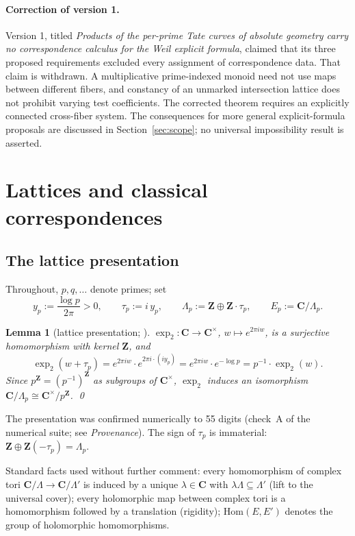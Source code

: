 \documentclass[11pt]{article}
\newtheorem{lemma}{Lemma}
\theoremstyle{definition}
\theoremstyle{remark}
\newcommand{\Z}{\mathbf{Z}}
\newcommand{\C}{\mathbf{C}}
\newcommand{\Hom}{\mathrm{Hom}}
\begin{document}
\paragraph{Correction of version 1.}
Version 1, titled \emph{Products of the per-prime Tate curves of absolute
geometry carry no correspondence calculus for the Weil explicit formula},
claimed that its three proposed requirements excluded every assignment of
correspondence data. That claim is withdrawn. A multiplicative prime-indexed
monoid need not use maps between different fibers, and constancy of an
unmarked intersection lattice does not prohibit varying test coefficients.
The corrected theorem requires an explicitly connected cross-fiber system.
The consequences for more general explicit-formula proposals are discussed
in Section~\ref{sec:scope}; no universal impossibility result is asserted.

\section{Lattices and classical correspondences}\label{sec:background}
\subsection{The lattice presentation}
\label{sec:notation}

Throughout, $p, q, \dots$ denote primes; set
\[
y_p := \frac{\log p}{2\pi} > 0 , \qquad
\tau_p := i\, y_p , \qquad
\Lambda_p := \Z \oplus \Z\cdot\tau_p , \qquad
E_p := \C/\Lambda_p .
\]

\begin{lemma}[lattice presentation; {\cite[\S4.1.2]{CC26}}]
\label{lem:lattice}
$\exp_2\colon \C \to \C^\times$, $w \mapsto e^{2\pi i w}$, is a surjective
homomorphism with kernel $\Z$, and
\[
\exp_2(w + \tau_p) = e^{2\pi i w}\cdot e^{2\pi i \cdot (i y_p)}
 = e^{2\pi i w}\cdot e^{-\log p} = p^{-1}\cdot \exp_2(w) .
\]
Since $p^\Z = (p^{-1})^\Z$ as subgroups of $\C^\times$, $\exp_2$ induces an
isomorphism $\C/\Lambda_p \cong \C^\times/p^\Z$. \qed
\end{lemma}

The presentation was confirmed numerically to 55 digits (check~A of the
numerical suite; see \emph{Provenance}). The sign of $\tau_p$ is
immaterial: $\Z \oplus \Z(-\tau_p) = \Lambda_p$.

Standard facts used without further comment: every homomorphism of complex
tori $\C/\Lambda \to \C/\Lambda'$ is induced by a unique $\lambda \in \C$
with $\lambda\Lambda \subseteq \Lambda'$ (lift to the universal cover); every
holomorphic map between complex tori is a homomorphism followed by a
translation (rigidity); $\Hom(E, E')$ denotes the group of holomorphic
homomorphisms.
\end{document}
